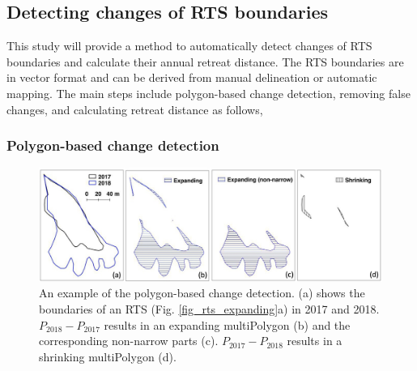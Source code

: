 \documentclass[authoryear,preprint,review,12pt]{elsarticle}
\begin{document}
\subsection{Detecting changes of RTS boundaries}
\label{sec_detect_rts_changes}

This study will provide a method to automatically detect changes of RTS boundaries and calculate their annual retreat distance.
The RTS boundaries are in vector format and can be derived from manual delineation or automatic mapping. 
The main steps include polygon-based change detection, removing false changes, and calculating retreat distance as follows, 

\subsubsection{Polygon-based change detection}
\label{sec_polygon_change_det}

\begin{figure} 
	\centering
	\includegraphics[width=14cm]{figs/rts_polygon_change_det_trim}
	\caption{An example of the polygon-based change detection. (a) shows the boundaries of an RTS (Fig. \ref{fig_rts_expanding}a) in 2017 and 2018. $P_{2018}-P_{2017}$ results in an expanding multiPolygon (b) and the corresponding non-narrow parts (c). $P_{2017}-P_{2018}$ results in a shrinking multiPolygon (d).}
	\label{fig_rts_change_det}
\end{figure}
\end{document}
